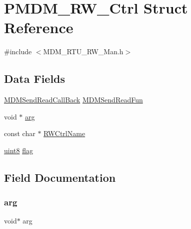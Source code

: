 \hypertarget{struct_p_m_d_m___r_w___ctrl}{}\section{P\+M\+D\+M\+\_\+\+R\+W\+\_\+\+Ctrl Struct Reference}
\label{struct_p_m_d_m___r_w___ctrl}


{\ttfamily \#include $<$M\+D\+M\+\_\+\+R\+T\+U\+\_\+\+R\+W\+\_\+\+Man.\+h$>$}

\subsection*{Data Fields}
\begin{DoxyCompactItemize}
\item 
\mbox{\hyperlink{_m_d_m___r_t_u___r_w___man_8h_a0ffbd8a7b888621e7e03c1036f07a879}{M\+D\+M\+Send\+Read\+Call\+Back}} \mbox{\hyperlink{struct_p_m_d_m___r_w___ctrl_ad3d538957e6a992754603cc331a3b623}{M\+D\+M\+Send\+Read\+Fun}}
\item 
void $\ast$ \mbox{\hyperlink{struct_p_m_d_m___r_w___ctrl_a9ce2ec4812a92cb6ab39f6e81e9173a9}{arg}}
\item 
const char $\ast$ \mbox{\hyperlink{struct_p_m_d_m___r_w___ctrl_a0cce05c85a67cd1dc05fe7fe11382941}{R\+W\+Ctrl\+Name}}
\item 
\mbox{\hyperlink{_m_d___r_t_u___type_8h_adde6aaee8457bee49c2a92621fe22b79}{uint8}} \mbox{\hyperlink{struct_p_m_d_m___r_w___ctrl_af11e40d15a1361229a78e772af5b3c94}{flag}}
\end{DoxyCompactItemize}


\subsection{Field Documentation}
\mbox{\label{struct_p_m_d_m___r_w___ctrl_a9ce2ec4812a92cb6ab39f6e81e9173a9}} 
\subsubsection{\texorpdfstring{arg}{arg}}
{\footnotesize\ttfamily void$\ast$ arg}

\mbox{\label{struct_p_m_d_m___r_w___ctrl_af11e40d15a1361229a78e772af5b3c94}} 
